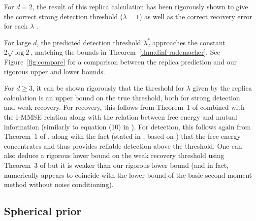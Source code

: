 \documentclass{article}
\begin{document}
For $d=2$, the result of this replica calculation has been rigorously shown to give the correct strong detection threshold ($\lambda = 1$) \cite{pwbm} as well as the correct recovery error for each $\lambda$ \cite{dam}.

For large $d$, the predicted detection threshold $\lambda_2^*$ approaches the constant $2 \sqrt{\log 2}$, matching the bounds in Theorem~\ref{thm:dinf-rademacher}. See Figure~\ref{fig:compare} for a comparison between the replica prediction and our rigorous upper and lower bounds.

For $d \ge 3$, it can be shown rigorously that the threshold for $\lambda$ given by the replica calculation is an upper bound on the true threshold, both for strong detection and weak recovery. For recovery, this follows from Theorem~1 of \cite{km} combined with the I-MMSE relation \cite{I-MMSE} along with the relation between free energy and mutual information (similarly to equation (10) in \cite{mi}). For detection, this follows again from Theorem~1 of \cite{km}, along with the fact (stated in \cite{km}, based on \cite{gt-limit}) that the free energy concentrates and thus provides reliable detection above the threshold. One can also deduce a rigorous lower bound on the weak recovery threshold using Theorem~3 of \cite{km} but it is weaker than our rigorous lower bound (and in fact, numerically appears to coincide with the lower bound of the basic second moment method without noise conditioning).


\FloatBarrier


\subsection{Spherical prior}
\end{document}
